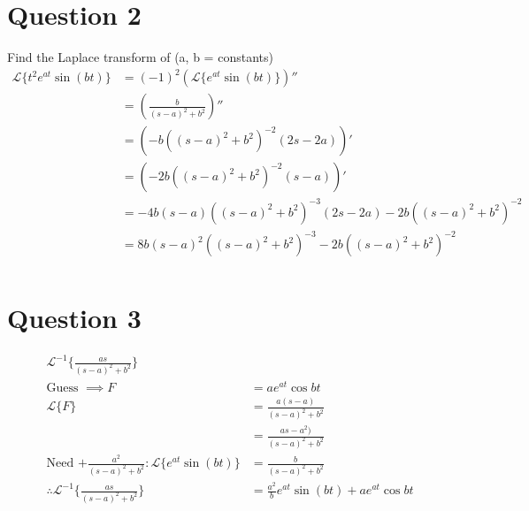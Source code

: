 \documentclass{article}
\begin{document}
\section*{Question 2}
Find the Laplace transform of (a, b = constants)
\begin{align*}
    \mathcal{L}\{t^2e^{at}\sin{(bt)}\} & = (-1)^2(\mathcal{L}\{e^{at}\sin(bt)\})''                  \\
                                       & = (\frac{b}{(s-a)^2+b^2})''                                \\
                                       & = (-b((s-a)^2+b^2)^{-2}(2s-2a))'                           \\
                                       & = (-2b((s-a)^2+b^2)^{-2}(s-a))'                            \\
                                       & = -4b(s-a)((s-a)^2+b^2)^{-3}(2s-2a) - 2b((s-a)^2+b^2)^{-2} \\
                                       & = 8b(s-a)^2((s-a)^2+b^2)^{-3} - 2b((s-a)^2+b^2)^{-2}       \\
\end{align*}
\section*{Question 3}
\begin{align*}
    \mathcal{L}^{-1}\{\frac{as}{(s-a)^2+b^2}\}                                                                          \\
    \text{Guess } \implies F                                            & = ae^{at}\cos{bt}                             \\
    \mathcal{L}\{F\}                                                    & = \frac{a(s-a)}{(s-a)^2+b^2}                  \\
                                                                        & = \frac{as-a^2)}{(s-a)^2+b^2}                 \\
    \text{Need +}\frac{a^2}{(s-a)^2+b^2}: \mathcal{L}\{e^{at}\sin(bt)\} & = \frac{b}{(s-a)^2+b^2}                       \\
    \therefore \mathcal{L}^{-1}\{\frac{as}{(s-a)^2+b^2}\}               & = \frac{a^2}{b}e^{at}\sin(bt)+ae^{at}\cos{bt} \\
\end{align*}
\end{document}
